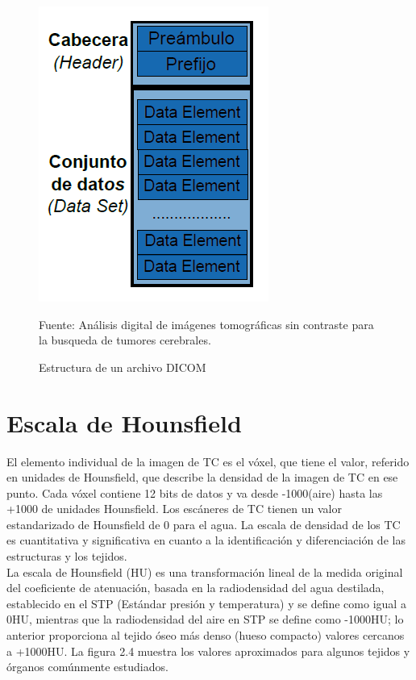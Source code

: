 \documentclass[12pt]{report}
\begin{document}
\begin{figure}[H]
\centering
\includegraphics[width = 7 cm, height = 8 cm]{estructura}
\caption{Estructura de un archivo DICOM}
Fuente: Análisis digital de imágenes tomográficas sin contraste para la busqueda de tumores cerebrales.
\end{figure}

\section{Escala de Hounsfield}
El elemento individual de la imagen de TC es el vóxel, que tiene el valor, referido en unidades de Hounsfield, que describe la densidad de la imagen de TC en ese punto. Cada vóxel contiene 12 bits de datos y va desde -1000(aire) hasta las +1000 de unidades Hounsfield. Los escáneres de TC tienen un valor estandarizado de Hounsfield de 0 para el agua. La escala de densidad de los TC es cuantitativa y significativa en cuanto a la identificación y diferenciación de las estructuras y los tejidos.\cite{hounsuno}\\

La escala de Hounsfield (HU) es una transformación lineal de la medida original del coeficiente de atenuación, basada en la radiodensidad del agua destilada, establecido en el STP (Estándar presión y temperatura) y se define como igual a 0HU, mientras que la radiodensidad del aire en STP se define como -1000HU; lo anterior proporciona al tejido óseo más denso (hueso compacto) valores cercanos a +1000HU. La figura 2.4 muestra los valores aproximados para algunos tejidos y órganos comúnmente estudiados.\\
\end{document}
